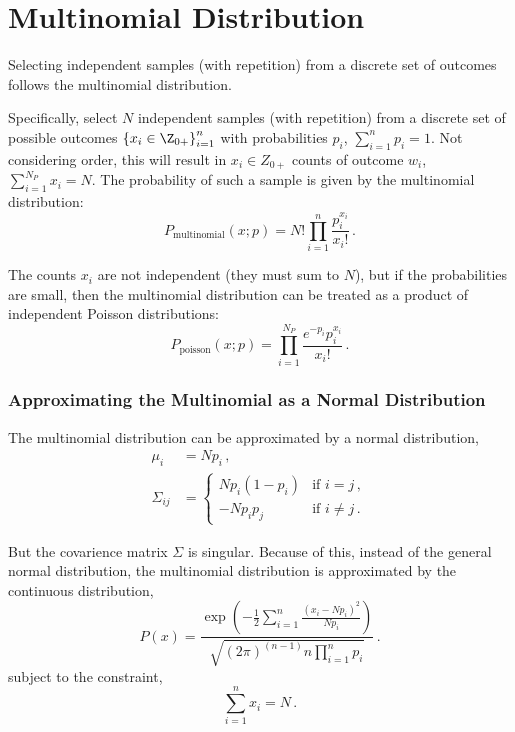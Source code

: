 \chapter{Multinomial Distribution}
Selecting independent samples (with repetition) from a discrete set of outcomes follows the multinomial distribution.

Specifically, select $N$ independent samples (with repetition) from a discrete set of possible outcomes $\left\{x_i \in \Z_{0+}\right\}_{i=1}^{n}$ with probabilities $p_i$,  $\sum_{i=1}^{n} p_i = 1$.  Not considering order, this will result in $x_i \in Z_{0+}$ counts of outcome $w_i$, $\sum_{i=1}^{N_P} x_i = N$.
The probability of such a sample is given by the multinomial distribution:
\begin{equation}
\label{eq:multinomial}
P_{\text{multinomial}}(x;p)={N!}\prod_{i=1}^{n} \frac{p_i^{x_i}}{x_i!} \,. 
\end{equation}

The counts $x_i$ are not independent (they must sum to $N$), but if the probabilities are small, then the multinomial distribution can be treated as a product of independent Poisson distributions:
\begin{equation}
P_{\text{poisson}}(x;p) = \prod_{i=1}^{N_P} \frac{e^{-p_i} p_i^{x_i}}{x_i!} \,.
\end{equation}

\subsection{Approximating the Multinomial as a Normal Distribution}
The multinomial distribution can be approximated by a normal distribution,
\begin{align}
\mu_i&=N p_i \,, \\
\Sigma_{ij} &= \left\{ \begin{array}{cl} N p_i (1-p_i)& \text{if $i=j$}\,, \\
                                      -N p_i p_j & \text{if $i \neq j$}\,.
  \end{array} \right.
\end{align}

But the covarience matrix $\Sigma$ is singular.  Because of this, instead of the general normal distribution, the multinomial distribution is approximated by the continuous distribution,
\begin{equation}
P(x)=\frac{\exp\left(-\frac{1}{2} \sum_{i=1}^{n} \frac{(x_i-Np_i)^2}{Np_i} \right)}{\sqrt{(2\pi)^{(n-1)} n \prod_{i=1}^{n} p_i}}   \,.
\end{equation}
subject to the constraint,
\begin{equation}
\sum_{i=1}^{n} x_i = N \,.
\end{equation}

